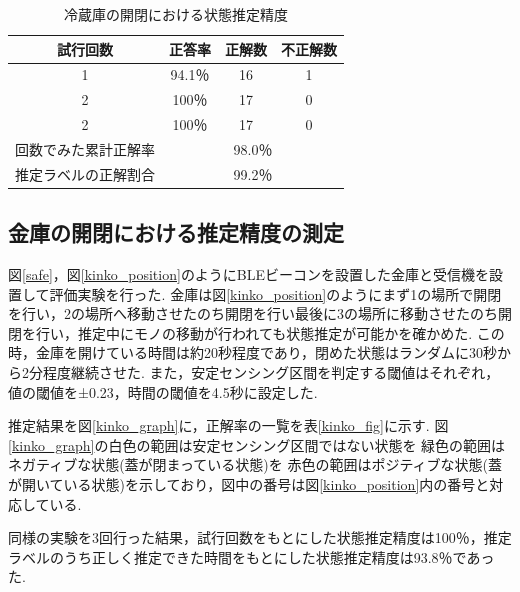 \documentclass[Japanese]{dicomopapers}
\begin{document}
\begin{table}[tbh]
    \begin{center}
        \caption{冷蔵庫の開閉における状態推定精度}
        \label{refrigerator_fig}
        \begin{tabular}{|c|c|c|c|} \hline
        試行回数 & 正答率 & 正解数 & 不正解数 \\ \hline
        1 & 94.1％ & 16 & 1 \\ \hline
        2 & 100％ & 17 & 0 \\ \hline
        2 & 100％ & 17 & 0 \\ \hline \hline
        回数でみた累計正解率 & \multicolumn{3}{c|}{98.0％} \\ \hline \hline
        推定ラベルの正解割合 & \multicolumn{3}{c|}{99.2％} \\ \hline
        \end{tabular}
    \end{center}
\end{table}



\subsection{金庫の開閉における推定精度の測定}
図\ref{safe}，図\ref{kinko_position}のようにBLEビーコンを設置した金庫と受信機を設置して評価実験を行った.
金庫は図\ref{kinko_position}のようにまず1の場所で開閉を行い，2の場所へ移動させたのち開閉を行い最後に3の場所に移動させたのち開閉を行い，推定中にモノの移動が行われても状態推定が可能かを確かめた.
この時，金庫を開けている時間は約20秒程度であり，閉めた状態はランダムに30秒から2分程度継続させた.
また，安定センシング区間を判定する閾値はそれぞれ，値の閾値を±0.23，時間の閾値を4.5秒に設定した.

推定結果を図\ref{kinko_graph}に，正解率の一覧を表\ref{kinko_fig}に示す.
図\ref{kinko_graph}の白色の範囲は安定センシング区間ではない状態を 緑色の範囲はネガティブな状態(蓋が閉まっている状態)を 赤色の範囲はポジティブな状態(蓋が開いている状態)を示しており，図中の番号は図\ref{kinko_position}内の番号と対応している.

同様の実験を3回行った結果，試行回数をもとにした状態推定精度は100％，推定ラベルのうち正しく推定できた時間をもとにした状態推定精度は93.8％であった.
\end{document}
